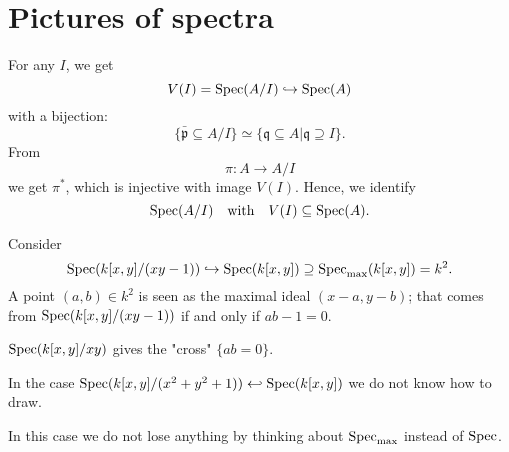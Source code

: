 \section{Pictures of spectra}

For any $I$, we get
\[ V(I) = \text{Spec}(A/{I}) \hookrightarrow \text{Spec}(A)\]
with a bijection:
\[\{ \bar{\mathfrak p} \subseteq A / I\} \simeq \{ \mathfrak q \subseteq A | \mathfrak q \supseteq I\}.\]
From
\[\pi: A \to A/{I}\]
we get $\pi^*$, which is injective with image $V(I)$. Hence, we identify
\[ \text{Spec}(A/I) \quad \text{with} \quad V(I) \subseteq \text{Spec}(A). \]

\begin{example}
  Consider
  \[ \text{Spec}(k[x,y]/(xy-1)) \hookrightarrow \text{Spec}(k[x,y]) \supseteq \text{Spec}_{\max}(k[x,y]) = k^2.\]
A point $(a, b) \in k^2$ is seen as the maximal ideal $(x-a,y-b)$; that comes from $\text{Spec}(k[x,y]/{(xy-1)})$ if and only if $ab-1 = 0$.
\end{example}

\begin{example}
  $\text{Spec} (k[x,y]/{xy})$ gives the "cross" $\{ ab=0 \}$.
\end{example}

\begin{example}
  In the case $\text{Spec}(k[x,y]/(x^2 + y^2 + 1)) \hookleftarrow \text{Spec}(k[x,y])$ we do not know how to draw.
\end{example}

\begin{note}
  In this case we do not lose anything by thinking about $\text{Spec}_{\max}$ instead of $\text{Spec}$.
\end{note}



